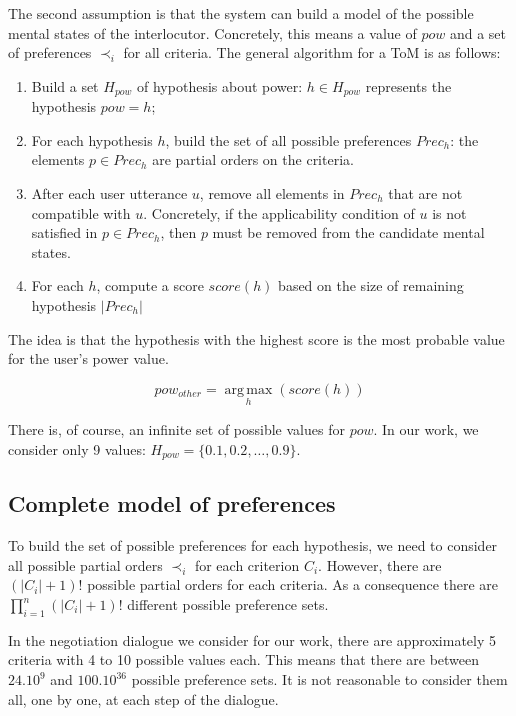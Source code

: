 \documentclass[conference, letterpaper]{IEEEtran}
\begin{document}
	The second assumption is that the system can build a model of the possible mental states of the interlocutor. Concretely, this means a value of $pow$ and a set of preferences $\prec_i$ for all criteria. The general algorithm for a ToM is as follows:
	\begin{enumerate}
		\item Build a set $H_{pow}$ of hypothesis about power: $h\in H_{pow}$ represents the hypothesis $pow=h$;
		\item For each hypothesis $h$, build the set of all possible preferences $Prec_h$: the elements $p\in Prec_h$ are partial orders on the criteria.
		\item After each user utterance $u$, remove all elements in $Prec_h$ that are not compatible with $u$. Concretely, if the applicability condition of $u$ is not satisfied in $p\in Prec_h$, then $p$ must be removed from the candidate mental states.
		\item For each $h$, compute a score $score(h)$ based on the size of remaining hypothesis $|Prec_h|$
	\end{enumerate}
	The idea is that the hypothesis with the highest score is the most probable value for the user's power value.
	
	\begin{equation}
	pow_{other} = \operatorname*{arg\,max}_{h} (score(h))
	\end{equation}
	
	There is, of course, an infinite set of possible values for $pow$. In our work, we consider only 9 values: $H_{pow} = \{0.1, 0.2, \ldots, 0.9\}$.
	
	\subsection{Complete model of preferences}
	
	To build the set of possible preferences for each hypothesis, we need to consider all possible partial orders $\prec_i$ for each criterion $C_i$. However, there are $(|C_i| + 1)!$ possible partial orders for each criteria. As a consequence there are $\prod_{i=1}^n (|C_i|+1)!$ different possible preference sets.
	
	In the negotiation dialogue we consider for our work, there are approximately 5 criteria with 4 to 10 possible values each. This means that there are between $24.10^9$ and $100.10^{36}$ possible preference sets. It is not reasonable to consider them all, one by one, at each step of the dialogue.
	
\end{document}
